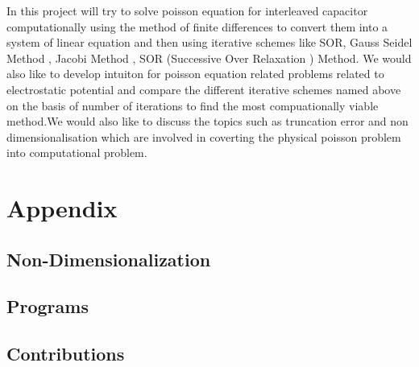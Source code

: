 \documentclass[12pt]{article}
\numberwithin{equation}{section}
\begin{document}
\abstract{}

In this project will try to solve poisson equation for interleaved capacitor computationally using the method of finite differences to convert them into a system of linear equation and then using iterative schemes like SOR, Gauss Seidel Method , Jacobi Method , SOR (Successive Over Relaxation ) Method. We would also like to develop intuiton for poisson equation related problems related to electrostatic potential and compare the different iterative schemes named above on the basis of number of iterations to find the most compuationally viable method.We would also like to discuss the topics such as truncation error and non dimensionalisation which are involved in coverting the physical poisson  problem into computational problem.
\newpage
\tableofcontents
\newpage

\newpage

\newpage

\newpage


\newpage

\newpage
\section{Appendix}
    \subsection{Non-Dimensionalization}
    
    \subsection{Programs}
    \subsection{Contributions}
\end{document}
